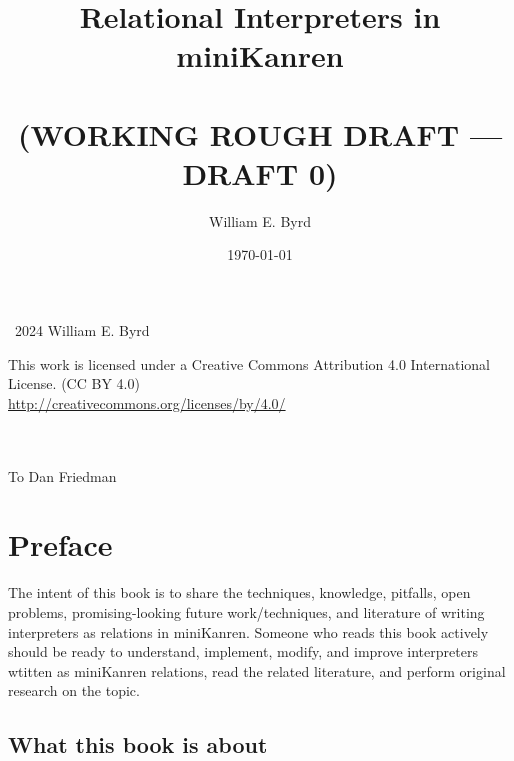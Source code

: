 \documentclass{book}
\begin{document}
\frontmatter

\date{\today}

\title{Relational Interpreters in miniKanren \\ \ \\ (WORKING ROUGH DRAFT --- DRAFT 0)}

\author{William E. Byrd}

\maketitle

{
  \fontsize{12}{12}
  \mbox{}
  \vfill


\noindent
\textcopyright~2024 William E. Byrd


\noindent
\huge
\ccLogo
\ccAttribution
\large


\noindent
This work is licensed under a Creative Commons Attribution 4.0 International License.
(CC BY 4.0) \\
\url{http://creativecommons.org/licenses/by/4.0/}
}

\newpage

{
\ \\

\ \\

\noindent
\huge
To Dan Friedman
}

\newpage

\tableofcontents

\chapter{Preface}

The intent of this book is to share the techniques, knowledge, pitfalls, open problems, promising-looking future work/techniques, and literature of writing interpreters as relations in miniKanren.
%
Someone who reads this book actively should be ready to understand, implement, modify, and improve interpreters wtitten as miniKanren relations, read the related literature, and perform original research on the topic.

\section{What this book is about}
\end{document}
